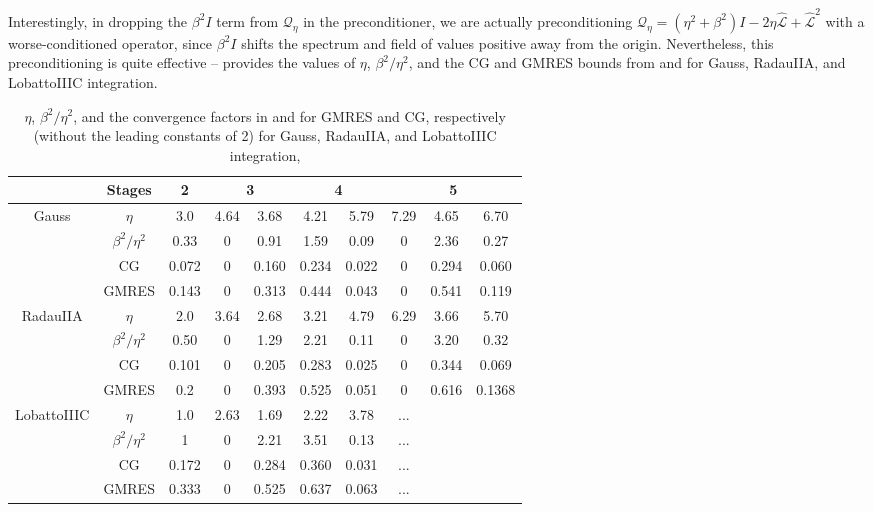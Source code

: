 \documentclass[review]{siamart}
\begin{document}
Interestingly, in dropping the $\beta^2 I$ term from $\mathcal{Q}_\eta$ in the
preconditioner, we are actually preconditioning $\mathcal{Q}_\eta = 
(\eta^2+\beta^2)I - 2\eta \widehat{\mathcal{L}} + \widehat{\mathcal{L}}^2$ with a
worse-conditioned operator, since $\beta^2I$ shifts the spectrum and field of values
positive away from the origin. Nevertheless, this preconditioning is quite effective --
 provides the values of $\eta$, $\beta^2/\eta^2$, and the CG and GMRES
bounds from  and  for Gauss, RadauIIA, and LobattoIIIC
integration.

%
{
\renewcommand{\tabcolsep}{4pt}
\renewcommand{\arraystretch}{1.15}
\begin{table}[!ht]
  \centering
  \begin{tabular}{| c | c | c | cc | cc | ccc |}  %
  \hline
& Stages & 2 & \multicolumn{2}{c}{3} & \multicolumn{2}{|c}{4} & \multicolumn{3}{|c|}{5} \\\hline\hline
\multirow{ 3}{*}{Gauss}
&$\eta$ & 3.0 & 4.64 & 3.68 & 4.21 & 5.79 & 7.29 & 4.65 & 6.70 \\
&$\beta^2/\eta^2$ & 0.33 & 0 & 0.91 & 1.59 & 0.09 & 0 & 2.36 & 0.27 \\
&CG & 0.072 & 0 & 0.160 & 0.234 & 0.022 & 0 & 0.294 & 0.060 \\
&GMRES & 0.143 & 0 & 0.313 & 0.444 & 0.043 & 0 & 0.541 & 0.119  \\\hline
\multirow{ 3}{*}{RadauIIA}
&$\eta$ & 2.0 & 3.64 & 2.68 & 3.21 & 4.79 & 6.29 & 3.66 & 5.70 \\
&$\beta^2/\eta^2$ & 0.50 & 0 & 1.29 & 2.21 & 0.11 & 0 & 3.20 & 0.32	\\
&CG & 0.101 & 0 & 0.205 & 0.283 & 0.025 & 0 & 0.344 & 0.069 \\
&GMRES & 0.2 & 0 & 0.393 & 0.525 & 0.051 & 0 & 0.616 & 0.1368 \\\hline
\multirow{ 3}{*}{LobattoIIIC}
&$\eta$ & 1.0 & 2.63 & 1.69 & 2.22 & 3.78 & ... & & \\
&$\beta^2/\eta^2$ & 1 & 0 & 2.21 & 3.51 & 0.13 & ... & & \\
&CG & 0.172 & 0 & 0.284 & 0.360 & 0.031 & ... & &    \\
&GMRES & 0.333 & 0 & 0.525 & 0.637 & 0.063 & ...  & & \\
  \hline
  \end{tabular}
  \caption{$\eta$, $\beta^2/\eta^2$, and the convergence factors in 
  and  for GMRES and CG, respectively (without the leading constants of
  2) for Gauss, RadauIIA, and LobattoIIIC integration,
}
\end{table}}
\end{document}
